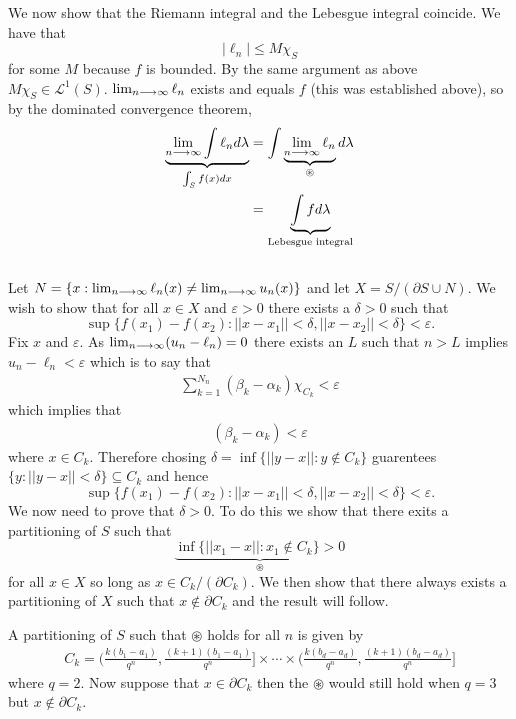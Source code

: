 \documentclass{unswmaths}
\begin{document}
We now show that the Riemann integral and the Lebesgue integral coincide. 
We have that 
$$
    |\ell_n| \leq M \chi_{S} 
$$
for some $ M $ because $ f $ is bounded. By the same argument as above $ M \chi_{S} \in \mathcal{L}^1(S) $. $ \lim_{n\longrightarrow\infty} \ell_n $ exists and equals $ f $ (this was established above), so by the dominated convergence theorem,
\begin{align*}
    \underbrace{\lim_{n\longrightarrow\infty} \int \ell_n d\lambda}_{\int_{S} f(x) dx} &= \int \underbrace{\lim_{n\longrightarrow\infty} \ell_n}_{\circledast} d\lambda \\
    &= \underbrace{\int f d\lambda}_{\text{Lebesgue integral}} \\
\end{align*}

\subsection{}
Let $ N = \{ x : \lim_{n\longrightarrow\infty}\ell_n(x) \neq \lim_{n\longrightarrow\infty}u_n(x) \} $ and
let $ X = S / (\partial S \cup N ) $. 
We wish to show that for all $ x \in X $ and $ \varepsilon > 0 $ there exists a $ \delta > 0 $ such that
$$ \sup\{ f(x_1) - f(x_2) : ||x-x_1|| < \delta, ||x-x_2|| < \delta \} < \varepsilon. $$
Fix $ x $ and $ \varepsilon $. As $ \lim_{n\longrightarrow\infty} (u_n - \ell_n) = 0 $ there exists an $ L $ such that $ n > L $ implies $ u_n - \ell_n < \varepsilon $
which is to say that 
\begin{align*}
    \sum_{k=1}^{N_n} (\beta_k - \alpha_k) \chi_{C_k} < \varepsilon
\end{align*}
which implies that
\begin{align*}
    (\beta_k - \alpha_k) < \varepsilon
\end{align*}
where $ x \in C_k $. Therefore chosing $ \delta = \inf\{ ||y-x|| : y \not\in C_k \} $ guarentees
$ \{ y : ||y - x || < \delta \} \subseteq C_k $ and hence $$ \sup\{ f(x_1) - f(x_2) : ||x-x_1|| < \delta, ||x-x_2|| < \delta \} < \varepsilon. $$
We now need to prove that $ \delta > 0 $. To do this we show that there exits a partitioning of $ S $ such that $$ \underbrace{\inf\{ || x_1 - x || : x_1 \not\in C_k \} > 0}_{\circledast}$$ for all $ x \in X $ so long as $ x \in C_k / (\partial C_k ) $. We then show that there always exists a partitioning of $ X $ such that $ x \not\in \partial C_k $ and the result will follow. 

A partitioning of $ S $ such that $ \circledast $ holds for all $ n $ is given by
\begin{align*}
    C_k = \Big( \frac{k(b_1 - a_1)}{q^n}, \frac{(k+1)(b_1 - a_1)}{q^n}\Big] \times \cdots \times \Big( \frac{k(b_d-a_d)}{q^n}, \frac{(k+1)(b_d-a_d)}{q^n} \Big]
\end{align*}
where $ q = 2 $. Now suppose that $ x \in \partial C_k $ then the $ \circledast $ would still hold when $ q = 3 $ but $ x \not\in \partial C_k $. 
\end{document}
